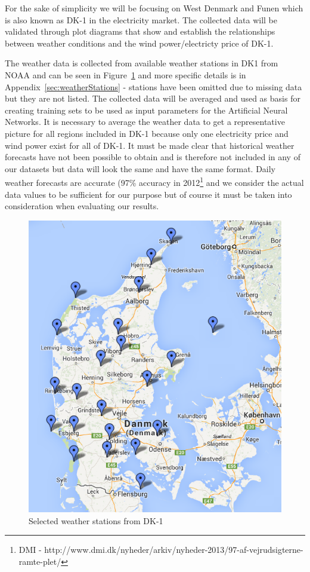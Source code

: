 For the sake of simplicity we will be focusing on West Denmark and Funen which is also known as DK-1 in the electricity market. The collected data will be validated through plot diagrams that show and establish the relationships between weather conditions and the wind power/electricty price of DK-1.

The weather data is collected from available weather stations in DK1 from NOAA and can be seen in Figure~\ref{fig:stations4average} and more specific details is in Appendix~\ref{sec:weatherStations} - stations have been omitted due to missing data but they are not listed. The collected data will be averaged and used as basis for creating training sets to be used as input parameters for the Artificial Neural Networks. It is necessary to average the weather data to get a representative picture for all regions included in DK-1 because only one electricity price and wind power exist for all of DK-1. It must be made clear that historical weather forecasts have not been possible to obtain and is therefore not included in any of our datasets but data will look the same and have the same format. Daily weather forecasts are accurate (97\% accuracy in 2012\footnote{DMI - http://www.dmi.dk/nyheder/arkiv/nyheder-2013/97-af-vejrudsigterne-ramte-plet/} and we consider the actual data values to be sufficient for our purpose but of course it must be taken into consideration when evaluating our results.

\begin{figure}[H]
\centering
\includegraphics[width=0.85\linewidth]{billeder/stations4average.png}
\caption{Selected weather stations from DK-1}
\label{fig:stations4average}
\end{figure}


